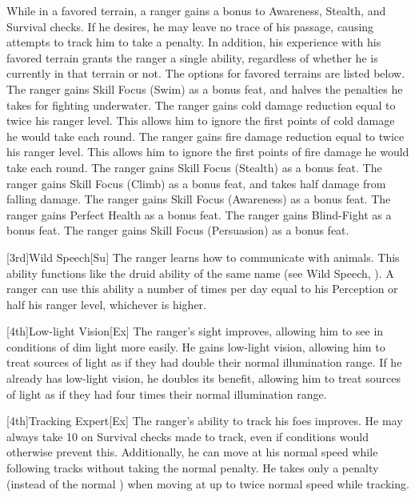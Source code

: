 \par While in a favored terrain, a ranger gains a  bonus to Awareness, Stealth, and Survival checks.
If he desires, he may leave no trace of his passage, causing attempts to track him to take a  penalty.
In addition, his experience with his favored terrain grants the ranger a single ability, regardless of whether he is currently in that terrain or not.
The options for favored terrains are listed below.
The ranger gains Skill Focus (Swim) as a bonus feat, and halves the penalties he takes for fighting underwater.
The ranger gains cold damage reduction equal to twice his ranger level.
This allows him to ignore the first points of cold damage he would take each round.
The ranger gains fire damage reduction equal to twice his ranger level.
This allows him to ignore the first points of fire damage he would take each round.
The ranger gains Skill Focus (Stealth) as a bonus feat.
The ranger gains Skill Focus (Climb) as a bonus feat, and takes half damage from falling damage.
The ranger gains Skill Focus (Awareness) as a bonus feat.
The ranger gains Perfect Health as a bonus feat.
The ranger gains Blind-Fight as a bonus feat.
The ranger gains Skill Focus (Persuasion) as a bonus feat.

[3rd]{Wild Speech}[Su]
The ranger learns how to communicate with animals.
This ability functions like the druid ability of the same name (see Wild Speech, ).
A ranger can use this ability a number of times per day equal to his Perception or half his ranger level, whichever is higher.

[4th]{Low-light Vision}[Ex]
The ranger's sight improves, allowing him to see in conditions of dim light more easily.
He gains low-light vision, allowing him to treat sources of light as if they had double their normal illumination range.
If he already has low-light vision, he doubles its benefit, allowing him to treat sources of light as if they had four times their normal illumination range.

[4th]{Tracking Expert}[Ex]
The ranger's ability to track his foes improves.
He may always take 10 on Survival checks made to track, even if conditions would otherwise prevent this.
Additionally, he can move at his normal speed while following tracks without taking the normal  penalty.
He takes only a  penalty (instead of the normal ) when moving at up to twice normal speed while tracking.

